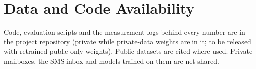 \documentclass[conference]{IEEEtran}
\begin{document}
\section*{Data and Code Availability}
Code, evaluation scripts and the measurement logs behind every number are in
the project repository (private while private-data weights are in it; to be
released with retrained public-only weights). Public datasets are cited where
used. Private mailboxes, the SMS inbox and models trained on them are not shared.



\end{document}
